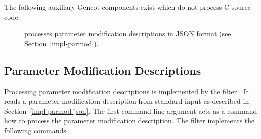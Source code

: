 The following auxiliary Gencot components exist which do not process C source code:
\begin{description}
\item[] processes parameter modification descriptions in JSON format (see Section~\ref{impl-parmod}).
\end{description}

\subsection{Parameter Modification Descriptions}

Processing parameter modification descriptions is implemented by the filter . It reads a parameter
modification description from standard input as described in Section~\ref{impl-parmod-json}. The first command line 
argument acts as a command how to process the parameter modification description. The filter implements the following
commands:
